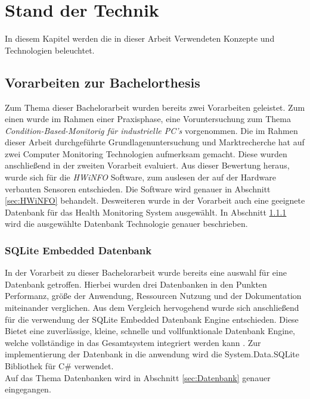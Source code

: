 \chapter{Stand der Technik}
In diesem Kapitel werden die in dieser Arbeit Verwendeten Konzepte und Technologien beleuchtet. 

\section{Vorarbeiten zur Bachelorthesis}
Zum Thema dieser Bachelorarbeit wurden bereits zwei Vorarbeiten geleistet. Zum einen wurde im Rahmen einer Praxisphase, eine Voruntersuchung zum Thema \textit{Condition-Based-Monitorig für industrielle PC's}  vorgenommen. Die im Rahmen dieser Arbeit \cite{PAMathias} durchgeführte Grundlagenuntersuchung und Marktrecherche hat auf zwei Computer Monitoring Technologien aufmerksam gemacht. Diese wurden anschließend in der zweiten Vorarbeit \cite{t3000} evaluiert. Aus dieser Bewertung heraus, wurde sich für die \textit{HWiNFO} Software, zum auslesen der auf der Hardware verbauten Sensoren entschieden. Die Software wird genauer in Abschnitt \ref{sec:HWiNFO} behandelt. Desweiteren wurde in der Vorarbeit \cite{t3000} auch eine geeignete Datenbank für das Health Monitoring System ausgewählt. In Abschnitt \ref{sec:SQLite} wird die ausgewählte Datenbank Technologie genauer beschrieben.   

\subsection{SQLite Embedded Datenbank}\label{sec:SQLite}
In der Vorarbeit zu dieser Bachelorarbeit wurde bereits eine auswahl für eine Datenbank getroffen. Hierbei wurden drei Datenbanken in den Punkten Performanz, größe der Anwendung, Ressourcen Nutzung und der Dokumentation miteinander verglichen. Aus dem Vergleich hervogehend wurde sich anschließend für die verwendung der SQLite Embedded Datenbank Engine entschieden. Diese Bietet eine zuverlässige, kleine, schnelle und vollfunktionale Datenbank Engine, welche vollständige in das Gesamtsystem integriert werden kann \cite{SQLiteHompage}. Zur implementierung der Datenbank in die anwendung wird die System.Data.SQLite Bibliothek für C\# verwendet.\\ 
Auf das Thema Datenbanken wird in Abschnitt \ref{sec:Datenbank} genauer eingegangen.


